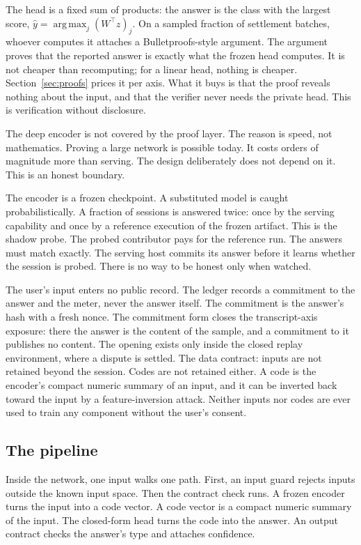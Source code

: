 \documentclass[11pt]{article}
\DeclareMathOperator{\argmax}{arg\,max}
\begin{document}
The head is a fixed sum of products: the answer is the class
with the largest score, $\hat y = \argmax_j (W^\top z)_j$.
On a sampled fraction of settlement batches, whoever computes it
attaches
a Bulletproofs-style argument. The argument proves that the
reported answer is exactly what the frozen head computes. It is
not cheaper than recomputing; for a linear head, nothing is
cheaper. Section~\ref{sec:proofs} prices it per axis. What it buys is
that the proof reveals nothing about the input, and that the
verifier never needs the private head. This is
verification without disclosure.

The deep encoder is not covered by the proof layer. The reason
is speed, not mathematics. Proving a large network is possible
today. It costs orders of magnitude more than serving. The
design deliberately does not depend on it. This is an honest
boundary.

The encoder is a frozen checkpoint. A substituted model is caught
probabilistically. A fraction of sessions is answered twice: once by the serving
capability and once by a reference execution of the frozen
artifact. This is the shadow probe. The probed contributor pays for
the reference run. The
answers must match exactly. The serving host commits its answer
before it learns whether the session is probed. There is no way
to be honest only when watched.

The user's input enters no public record. The ledger records a
commitment to the answer and the meter, never the answer
itself. The commitment is the answer's hash with a fresh nonce. The commitment form closes
the transcript-axis exposure: there the answer is the content of
the sample, and a commitment to it publishes no content. The
opening exists only inside the closed replay environment, where a
dispute is settled. The data contract: inputs are not retained beyond the
session. Codes are not retained either. A code is the encoder's
compact numeric summary of an input, and it can be inverted back
toward the input by a feature-inversion attack. Neither inputs
nor codes are ever used to train any component without the
user's consent.

\subsection{The pipeline}

Inside the network, one input walks one path. First, an input guard rejects
inputs outside the known input space. Then the contract check
runs. A frozen encoder turns the input into a code vector. A code
vector is a compact numeric summary of the input. The closed-form
head turns the code into the answer. An output contract checks the
answer's type and attaches confidence.
\end{document}
